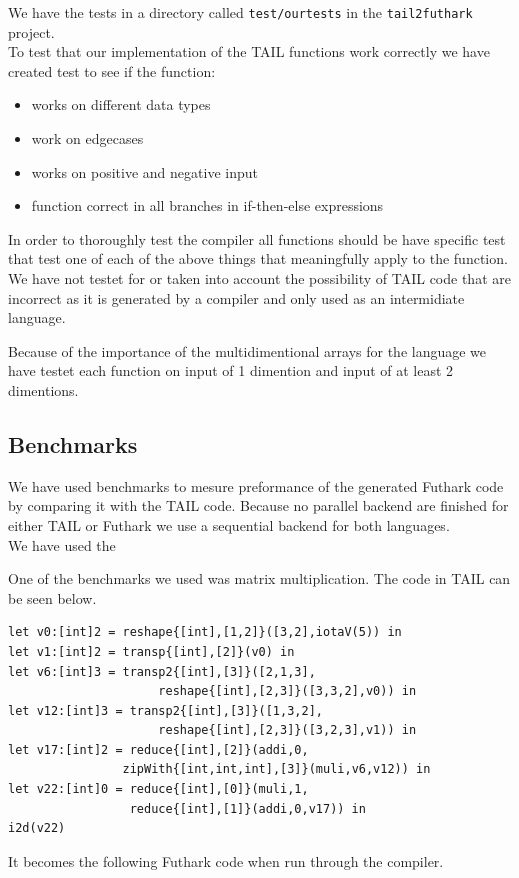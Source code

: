 \documentclass[11pt]{article}
\begin{document}
We have the tests in a directory called {\tt test/ourtests} in the {\tt tail2futhark} project. \\

To test that our implementation of the TAIL functions work correctly we have created test to see if the function:
\begin{itemize}
\item works on different data types
\item work on edgecases
\item works on positive and negative input
\item function correct in all branches in if-then-else expressions
\end{itemize}
In order to thoroughly test the compiler all functions should be have specific test that test one of each of the above things
that meaningfully apply to the function. \\

We have not testet for or taken into account the possibility of TAIL code that are incorrect as it is generated by a compiler and only used as an intermidiate language. 

Because of the importance of the multidimentional arrays for the language we have testet each function on input of 1 dimention and input of at least 2 dimentions. 

\subsection{Benchmarks}
We have used benchmarks to mesure preformance of the generated Futhark code by comparing it with the TAIL code.
Because no parallel backend are finished for either TAIL or Futhark we use a sequential backend for both languages. \\

We have used the 


One of the benchmarks we used was matrix multiplication. The code in TAIL can be seen below. 

\begin{lstlisting}
let v0:[int]2 = reshape{[int],[1,2]}([3,2],iotaV(5)) in
let v1:[int]2 = transp{[int],[2]}(v0) in
let v6:[int]3 = transp2{[int],[3]}([2,1,3],
                     reshape{[int],[2,3]}([3,3,2],v0)) in
let v12:[int]3 = transp2{[int],[3]}([1,3,2],
                     reshape{[int],[2,3]}([3,2,3],v1)) in
let v17:[int]2 = reduce{[int],[2]}(addi,0,
                zipWith{[int,int,int],[3]}(muli,v6,v12)) in
let v22:[int]0 = reduce{[int],[0]}(muli,1,
                 reduce{[int],[1]}(addi,0,v17)) in
i2d(v22)
\end{lstlisting}

It becomes the following Futhark code when run through the compiler.

{} 

\end{document}
